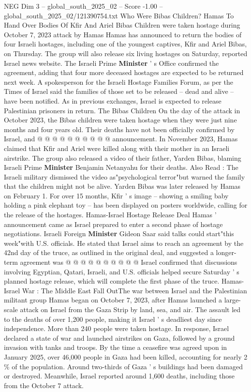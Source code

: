 \begin{textsample}{NEG Dim 3 – global\_south\_2025\_02 – Score -1.00 – global\_south\_2025\_02/121390754.txt}  \label{ex:f3_neg_014}
Who Were Bibas Children?
Hamas To Hand Over Bodies Of Kfir And Ariel Bibas Children were taken hostage during October 7, 2023 attack by Hamas Hamas has announced to return the bodies of four Israeli hostages, including one of the youngest captives, Kfir and Ariel Bibas, on Thursday.
The group will also release six living hostages on Saturday, reported Israel news website.
The Israeli Prime \textbf{Minister} ' s Office confirmed the agreement, adding that four more deceased hostages are expected to be returned next week.
A spokesperson for the Israeli Hostage Families Forum, as per the Times of Israel said the families of those set to be released -- dead and alive -- have been notified.
As in previous exchanges, Israel is expected to release Palestinian prisoners in return.
The Bibas Children On the day of the attack in October 2023, the Bibas children were taken hostage when they were just nine months and four years old.
Their deaths have not been officially confirmed by Israel, and @ @ @ @ @ @ @ @ @ @ announcement.
In November 2023, Hamas claimed that Kfir and Ariel were killed along with their mother in an Israeli airstrike.
The group also released a video of their father, Yarden Bibas, blaming Israeli Prime \textbf{Minister} Benjamin Netanyahu for their deaths.
Also Read : The Israeli military dismissed the video as"psychological terror"but warned the family that the children might not be alive.
Yarden Bibas was later released by Hamas on February 1.
For over 15 months, Kfir ' s image -- showing a smiling baby holding a pink elephant toy -- has been displayed on posters worldwide, calling for the release of the hostages.
Hamas-Israel Hostage Release Deal Hamas ' announcement came as Israel prepared to enter a second phase of hostage negotiations.
Israeli Foreign \textbf{Minister} Gideon Saar said talks could start"this week"with U.S. officials.
He stated that Israel aims to reach an agreement by the 42nd day of the truce, as outlined in the original deal, and suggested a longer-term agreement was @ @ @ @ @ @ @ @ @ @ Israel confirmed that discussions involving Egyptian, Qatari, Israeli, and U.S. officials helped secure Saturday ' s planned hostage release, which will complete the first phase of the truce.
Hamas-Israel War : The Middle East Fall OutThe war between Israel and the Palestinian militant group Hamas began on October 7, 2023, after Hamas launched a large-scale attack on Israel from the Gaza Strip by land, sea, and air.
The assault led to the deaths of over 1,200 people, making it Israel ' s deadliest day since independence.
More than 240 people were taken hostage.
In response, Israel declared a state of war and launched airstrikes on Gaza, followed by a ground invasion with tanks and troops.
By the time a ceasefire was agreed upon in January 2025, over 46,000 people in Gaza had been killed, accounting for nearly 2 \% of the population.
Around two-thirds of Gaza ' s buildings had been damaged or destroyed.
Meanwhile, Israel reported around 1,600 deaths, including those from the October 7 attack.

\end{textsample}
